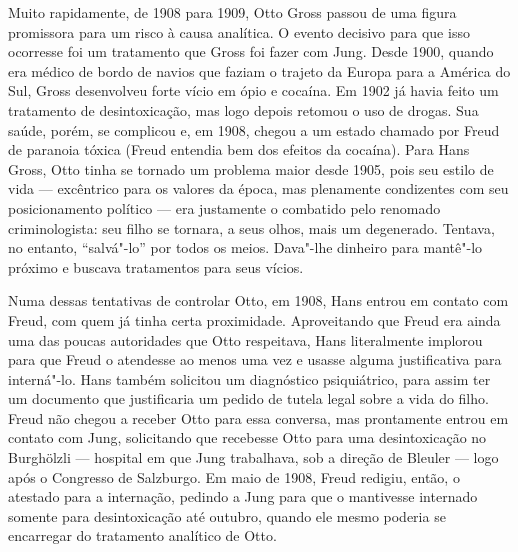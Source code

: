 Muito rapidamente, de 1908 para 1909, Otto Gross passou de uma figura
promissora para um risco à causa analítica. O evento decisivo para que
isso ocorresse foi um tratamento que Gross foi fazer com Jung. Desde
1900, quando era médico de bordo de navios que faziam o trajeto da
Europa para a América do Sul, Gross desenvolveu forte vício em ópio e
cocaína. Em 1902 já havia feito um tratamento de desintoxicação, mas
logo depois retomou o uso de drogas. Sua saúde, porém, se complicou e,
em 1908, chegou a um estado chamado por Freud de paranoia tóxica (Freud
entendia bem dos efeitos da cocaína). Para Hans Gross, Otto tinha se
tornado um problema maior desde 1905, pois seu estilo de vida ---
excêntrico para os valores da época, mas plenamente condizentes com seu
posicionamento político --- era justamente o combatido pelo renomado
criminologista: seu filho se tornara, a seus olhos, mais um degenerado.
Tentava, no entanto, ``salvá"-lo'' por todos os meios. Dava"-lhe dinheiro
para mantê"-lo próximo e buscava tratamentos para seus vícios.

Numa dessas tentativas de controlar Otto, em 1908, Hans entrou em
contato com Freud, com quem já tinha certa proximidade. Aproveitando que
Freud era ainda uma das poucas autoridades que Otto respeitava, Hans
literalmente implorou para que Freud o atendesse ao menos uma vez e
usasse alguma justificativa para interná"-lo. Hans também solicitou um
diagnóstico psiquiátrico, para assim ter um documento que justificaria
um pedido de tutela legal sobre a vida do filho. Freud não chegou a
receber Otto para essa conversa, mas prontamente entrou em contato com
Jung, solicitando que recebesse Otto para uma desintoxicação no
Burghölzli --- hospital em que Jung trabalhava, sob a direção de Bleuler
--- logo após o Congresso de Salzburgo. Em maio de 1908, Freud redigiu,
então, o atestado para a internação, pedindo a Jung para que o
mantivesse internado somente para desintoxicação até outubro, quando ele
mesmo poderia se encarregar do tratamento analítico de Otto.


